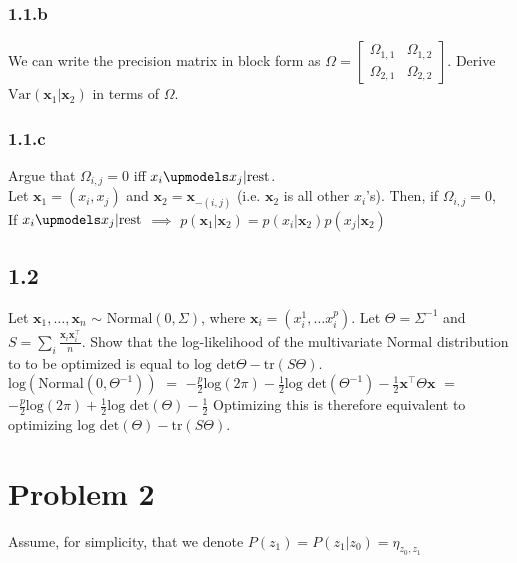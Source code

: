 \documentclass[12pt]{article}
\begin{document}
\subsubsection*{1.1.b}
We can write the precision matrix in block form as $\Omega = \left[ 
\begin{smallmatrix} \Omega_{1,1} & \Omega_{1,2} \\ \Omega_{2,1} & \Omega_{2,2}
\end{smallmatrix} \right]$.
Derive $\text{Var}(\textbf{x}_1 | \textbf{x}_2)$ in terms of $\Omega$.

\subsubsection*{1.1.c}
Argue that $\Omega_{i,j}=0$ iff $x_i \upmodels x_j | \text{rest}$.\\

Let $\textbf{x}_1 = (x_i,x_j)$ and $\textbf{x}_2 = \textbf{x}_{-(i,j)}$ (i.e. $\textbf{x}_2$ is all other $x_i$'s). Then, if $\Omega_{i,j} = 0$, 
\\

If $x_i \upmodels x_j | \text{rest}$ $\implies$ $p(\textbf{x}_1 | \textbf{x}_2) = p(x_i | \textbf{x}_2) p(x_j | \textbf{x}_2)$


\subsection*{1.2}
Let $\textbf{x}_1, \ldots, \textbf{x}_n$ $\sim$ $\text{Normal}(0,\Sigma)$, where $\textbf{x}_i = (x_i^1, \ldots x_i^p)$. Let $\Theta = \Sigma^{-1}$ and $S = \sum_i \frac{\textbf{x}_i \textbf{x}_i^\top}{n}$. Show that the log-likelihood of the multivariate Normal distribution to to be optimized is equal to $\text{log} \text{ det} \Theta - \text{tr}(S\Theta)$.
\\


$\text{log}(\text{Normal}(0,\Theta^{-1}))$ $=$ 
$-\frac{p}{2}\text{log}(2\pi) - \frac{1}{2} \text{log} \text{ det}(\Theta^{-1}) - \frac{1}{2}\textbf{x}^{\top} \Theta \textbf{x}$ 
$=$ 
$-\frac{p}{2}\text{log}(2\pi) + \frac{1}{2} \text{log} \text{ det}(\Theta) - \frac{1}{2}$
Optimizing this is therefore equivalent to optimizing $\text{log} \text{ det}(\Theta) - \text{tr}(S\Theta)$.


\section*{Problem 2}
\label{sec:prob2}
Assume, for simplicity, that we denote $P(z_1) = P(z_1 | z_0) = \eta_{z_0,z_1}$
\end{document}
